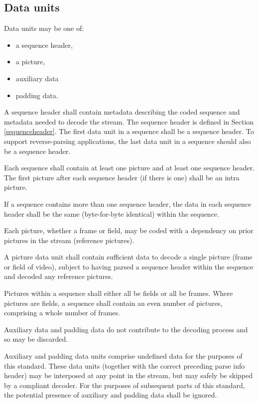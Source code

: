 \subsection{Data units}

Data units may be one of:
\begin{itemize}
\item a sequence header, 
\item a picture, 
\item auxiliary data 
\item padding data. 
\end{itemize}

A sequence header shall contain metadata describing the coded sequence 
and metadata needed to decode the stream. The sequence header is defined 
in Section \ref{sequenceheader}. The first data unit in a sequence shall be a 
sequence header. To support reverse-parsing applications, the last data unit in 
a sequence should also be a sequence header.

Each sequence shall contain at least one picture and at least one sequence header.
The first picture after each sequence header (if there is one) shall be an intra picture.

If a sequence contains more than one sequence header, the data 
in each sequence header shall be the same (byte-for-byte identical) within the sequence.

Each picture, whether a frame or field, may be coded with a dependency 
on prior pictures in the stream (reference pictures).

A picture data unit shall contain sufficient data to decode a single picture 
(frame or field of video), subject to having parsed a sequence header within 
the sequence and decoded any reference pictures.

Pictures within a sequence shall either all be fields or all be frames. 
Where pictures are fields, a sequence shall contain an even number of pictures, 
comprising a whole number of frames.

Auxiliary data and padding data do not contribute to the decoding 
process and so may be discarded. 


Auxiliary and padding data units comprise undefined data for the purposes
 of this standard. These data units (together with the correct preceding 
parse info header) may be interposed at any point in the stream, but 
may safely be skipped by a compliant decoder. For the purposes of 
subsequent parts of this standard, the potential presence of auxiliary 
and padding data shall be ignored.

